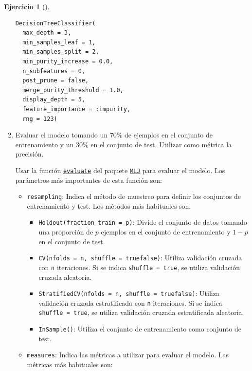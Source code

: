 \documentclass[
  a4paper,
]{scrreport}
\providecommand{\tightlist}{%
  \setlength{\itemsep}{0pt}\setlength{\parskip}{0pt}}\usepackage{longtable,booktabs,array}
\theoremstyle{definition}
\newtheorem{exercise}{Ejercicio}[chapter]
\theoremstyle{remark}
\begin{document}
\begin{exercise}[]
\begin{enumerate}
\begin{tcolorbox}
\begin{verbatim}
DecisionTreeClassifier(
  max_depth = 3, 
  min_samples_leaf = 1, 
  min_samples_split = 2, 
  min_purity_increase = 0.0, 
  n_subfeatures = 0, 
  post_prune = false, 
  merge_purity_threshold = 1.0, 
  display_depth = 5, 
  feature_importance = :impurity, 
  rng = 123)
\end{verbatim}

  \end{tcolorbox}
\item
  Evaluar el modelo tomando un 70\% de ejemplos en el conjunto de
  entrenamiento y un 30\% en el conjunto de test. Utilizar como métrica
  la precisión.

  \begin{tcolorbox}[enhanced jigsaw, left=2mm, colback=white, coltitle=black, opacitybacktitle=0.6, titlerule=0mm, breakable, bottomrule=.15mm, toptitle=1mm, bottomtitle=1mm, colbacktitle=quarto-callout-note-color!10!white, opacityback=0, rightrule=.15mm, title=\textcolor{quarto-callout-note-color}{\faInfo}\hspace{0.5em}{Ayuda}, colframe=quarto-callout-note-color-frame, arc=.35mm, leftrule=.75mm, toprule=.15mm]

  Usar la función
  \href{https://juliaai.github.io/MLJ.jl/stable/evaluating_model_performance/\#MLJBase.evaluate!}{\texttt{evaluate}}
  del paquete \href{https://juliaai.github.io/MLJ.jl/}{\texttt{MLJ}}
  para evaluar el modelo. Los parámetros más importantes de esta función
  son:

  \begin{itemize}
  \tightlist
  \item
    \texttt{resampling}: Indica el método de muestreo para definir los
    conjuntos de entrenamiento y test. Los métodos más habituales son:

    \begin{itemize}
    \tightlist
    \item
      \texttt{Holdout(fraction\_train\ =\ p)}: Divide el conjunto de
      datos tomando una proporción de \(p\) ejemplos en el conjunto de
      entrenamiento y \(1-p\) en el conjunto de test.
    \item
      \texttt{CV(nfolds\ =\ n,\ shuffle\ =\ true\textbar{}false)}:
      Utiliza validación cruzada con \texttt{n} iteraciones. Si se
      indica \texttt{shuffle\ =\ true}, se utiliza validación cruzada
      aleatoria.
    \item
      \texttt{StratifiedCV(nfolds\ =\ n,\ shuffle\ =\ true\textbar{}false)}:
      Utiliza validación cruzada estratificada con \texttt{n}
      iteraciones. Si se indica \texttt{shuffle\ =\ true}, se utiliza
      validación cruzada estratificada aleatoria.
    \item
      \texttt{InSample()}: Utiliza el conjunto de entrenamiento como
      conjunto de test.
    \end{itemize}
  \item
    \texttt{measures}: Indica las métricas a utilizar para evaluar el
    modelo. Las métricas más habituales son:


\end{itemize}
\end{tcolorbox}
\end{enumerate}
\end{exercise}
\end{document}
